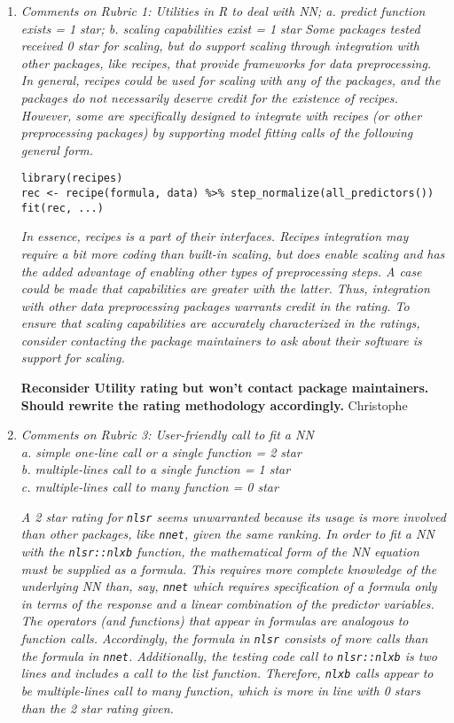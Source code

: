 \documentclass[12pt]{article}
\newcommand{\code}{\texttt}
\newcommand{\red}[1]{{\color{red}#1}}
\begin{document}
\begin{enumerate}


\item \textit{Comments on Rubric 1: Utilities in R to deal with NN; 
a. predict function exists = 1 star;
 b. scaling capabilities exist = 1 star}
\textit{
Some packages tested received 0 star for scaling, but do support scaling through integration with other packages, like recipes, that provide frameworks for data preprocessing.  In general, recipes could be used for scaling with any of the packages, and the packages do not necessarily deserve credit for the existence of recipes.  However, some are specifically designed to integrate with recipes (or other preprocessing packages) by supporting model fitting calls of the following general form.
}
\begin{verbatim}
library(recipes)
rec <- recipe(formula, data) %>% step_normalize(all_predictors())
fit(rec, ...)
\end{verbatim}
\textit{
In essence, recipes is a part of their interfaces.  Recipes integration may require a bit more coding than built-in scaling, but does enable scaling and has the added advantage of enabling other types of preprocessing steps.  A case could be made that capabilities are greater with the latter.  Thus, integration with other data preprocessing packages warrants credit in the rating.  To ensure that scaling capabilities are accurately characterized in the ratings, consider contacting the package maintainers to ask about their software is support for scaling.
}

\textbf{Reconsider Utility rating but won't contact package maintainers. 
Should rewrite the rating methodology accordingly.}
\red{Christophe}


\item \textit{
Comments on Rubric 3: User-friendly call to fit a NN\\
       a. simple one-line call or a single function = 2 star\\
       b. multiple-lines call to a single function = 1 star\\
       c. multiple-lines call to many function = 0 star}

       
 \textit{A 2 star rating for \code{nlsr} seems unwarranted because its usage is more involved than other packages, like \code{nnet}, given the same ranking.  In order to fit a NN with the \code{nlsr::nlxb} function, the mathematical form of the NN equation must be supplied as a formula.  This requires more complete knowledge of the underlying NN than, say, \code{nnet} which requires specification of a formula only in terms of the response and a linear combination of the predictor variables.  The operators (and functions) that appear in formulas are analogous to function calls.  Accordingly, the formula in \code{nlsr} consists of more calls than the formula in \code{nnet}.  Additionally, the testing code call to \code{nlsr::nlxb} is two lines and includes a call to the list function.  Therefore, \code{nlxb} calls appear to be multiple-lines call to many function, which is more in line with 0 stars than the 2 star rating given.}


\end{enumerate}
\end{document}
